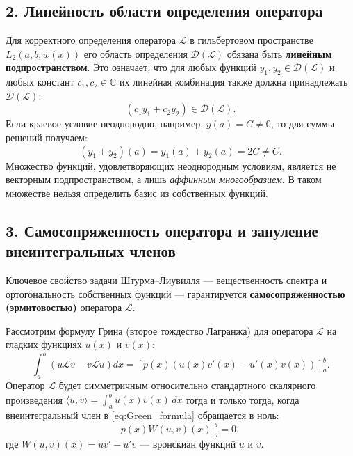 \documentclass[12pt,a4paper]{article}
\begin{document}
\subsection*{2. Линейность области определения оператора}
Для корректного определения оператора $\mathcal{L}$ в гильбертовом пространстве $L_2(a, b; w(x))$ его область определения $\mathcal{D}(\mathcal{L})$ обязана быть \textbf{линейным подпространством}. Это означает, что для любых функций $y_1, y_2 \in \mathcal{D}(\mathcal{L})$ и любых констант $c_1, c_2 \in \mathbb{C}$ их линейная комбинация также должна принадлежать $\mathcal{D}(\mathcal{L})$:
\begin{equation*}
    (c_1 y_1 + c_2 y_2) \in \mathcal{D}(\mathcal{L}).
\end{equation*}
Если краевое условие неоднородно, например, $y(a) = C \neq 0$, то для суммы решений получаем:
\begin{equation*}
    (y_1 + y_2)(a) = y_1(a) + y_2(a) = 2C \neq C.
\end{equation*}
Множество функций, удовлетворяющих неоднородным условиям, является не векторным подпространством, а лишь \textit{аффинным многообразием}. В таком множестве нельзя определить базис из собственных функций.

\subsection*{3. Самосопряженность оператора и зануление внеинтегральных членов}
Ключевое свойство задачи Штурма--Лиувилля — вещественность спектра и ортогональность собственных функций — гарантируется \textbf{самосопряженностью (эрмитовостью)} оператора $\mathcal{L}$.

Рассмотрим формулу Грина (второе тождество Лагранжа) для оператора $\mathcal{L}$ на гладких функциях $u(x)$ и $v(x)$:
\begin{equation}
    \int_a^b \left( u \mathcal{L}v - v \mathcal{L}u \right) dx = \left[ p(x) \left( u(x)v'(x) - u'(x)v(x) \right) \right]_a^b.
    \label{eq:Green_formula}
\end{equation}
Оператор $\mathcal{L}$ будет симметричным относительно стандартного скалярного произведения $\langle u, v \rangle = \int_a^b u(x)v(x)\,dx$ тогда и только тогда, когда внеинтегральный член в \eqref{eq:Green_formula} обращается в ноль:
\begin{equation}
    \left. p(x) W(u, v)(x) \right|_a^b = 0,
    \label{eq:Wronskian_zero}
\end{equation}
где $W(u, v)(x) = u v' - u' v$ — вронскиан функций $u$ и $v$.
\end{document}
